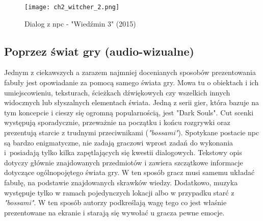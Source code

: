 \begin{figure}[h]
    \texttt{[image: ch2\_witcher\_2.png]}
    \caption{Dialog z \gls{npc} - "Wiedźmin 3" (2015)}
    \centering
    \label{fig:ch1_2_2_dialogue}
\end{figure}

\subsection{Poprzez świat gry (audio-wizualne)}

Jednym z ciekawszych a zarazem najmniej docenianych\cite{the_evolution_of_video_games} sposobów prezentowania fabuły
jest opowiadanie za pomocą samego świata gry. Mowa tu o obiektach i ich umiejscowieniu, teksturach,
ścieżkach dźwiękowych czy wszelkich innych widocznych lub słyszalnych elementach świata. Jedną z
serii gier, która bazuje na tym koncepcie i cieszy się ogromną popularnością, jest "Dark Souls".
Cut scenki występują sporadycznie, przeważnie na początku i końcu rozgrywki oraz prezentują starcie
z trudnymi przeciwnikami (\textit{"bossami"}). Spotykane postacie \gls{npc} są bardzo enigmatyczne, nie
zadają graczowi wprost zadań do wykonania i~posiadają tylko kilka zapętlających się kwestii
dialogowych. Tekstowy opis dotyczy głównie znajdowanych przedmiotów i zawiera szczątkowe informacje
dotyczące ogólnopojętego świata gry. W ten sposób gracz musi samemu układać fabułę, na podstawie
znajdowanych skrawków wiedzy. Dodatkowo, muzyka występuje tylko w ramach pojedynczych lokacji albo
w przypadku starć z \textit{"bossami"}. W ten sposób autorzy podkreślają wagę tego co jest właśnie
prezentowane na ekranie i starają się wywołać u gracza pewne emocje.